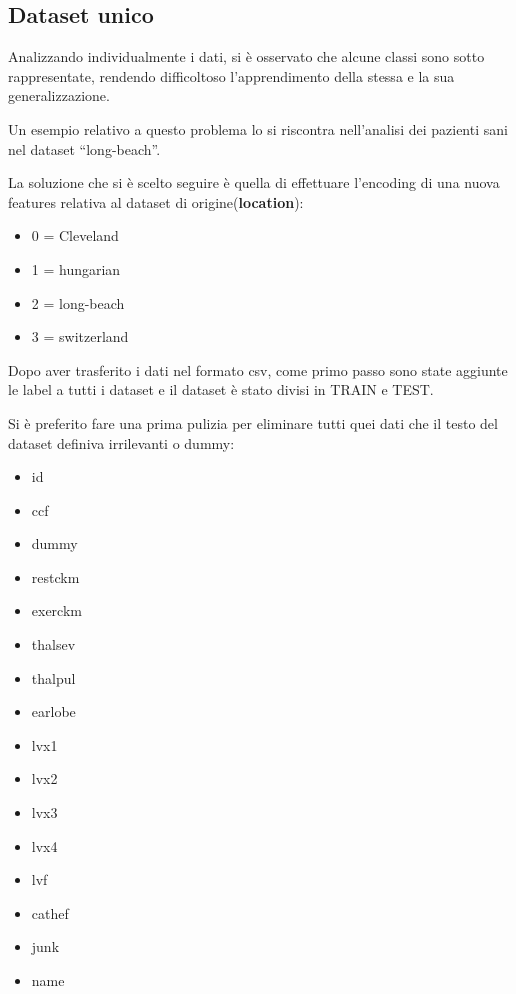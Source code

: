\documentclass[a4paper]{article}
\begin{document}
    \subsection{Dataset unico}

    Analizzando individualmente i dati, si è osservato che alcune classi sono sotto rappresentate,
    rendendo difficoltoso l'apprendimento della stessa e la sua generalizzazione.

    Un esempio relativo a questo problema lo si riscontra nell'analisi dei pazienti sani nel dataset ``long-beach''.

    La soluzione che si è scelto seguire è quella di effettuare l'encoding di una nuova features relativa al dataset di origine(\textbf{location}):
    \begin{itemize}
        \item 0 = Cleveland
        \item 1 = hungarian
        \item 2 = long-beach
        \item 3 = switzerland
    \end{itemize}

    Dopo aver trasferito i dati nel formato csv, come primo passo sono state aggiunte le label a tutti i 
    dataset e il dataset è stato divisi in TRAIN e TEST.

    Si è preferito fare una prima pulizia per eliminare tutti quei dati che il testo del dataset definiva irrilevanti
    o dummy:
    
    \small{
        \begin{itemize}
            \item id
            \item ccf
            \item dummy
            \item restckm
            \item exerckm
            \item thalsev
            \item thalpul
            \item earlobe
            \item lvx1
            \item lvx2
            \item lvx3
            \item lvx4
            \item lvf
            \item cathef
            \item junk
            \item name
        \end{itemize}
    }
\end{document}
